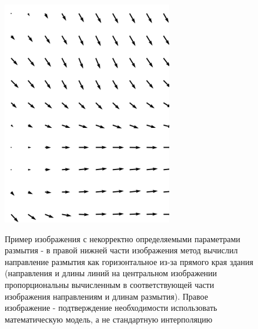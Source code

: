 \begin{figure} [H]
\begin{minipage}[h]{0.28\linewidth}
\includegraphics[width=1\linewidth, right]{pics/fields/vec.png} \\ 
\end{minipage}
\caption{Пример изображения с некорректно определяемыми параметрами размытия - в правой нижней части изображения метод вычислил направление размытия как горизонтальное из-за прямого края здания (направления и длины линий на центральном изображении пропорциональны вычисленным в соответствующей части изображения направлениям и длинам размытия). Правое изображение - подтверждение необходимости использовать математическую модель, а не стандартную интерполяцию }
\label{ris:bad_interpolation}
\end{figure}

